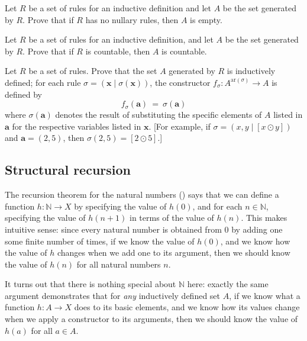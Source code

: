 \begin{exercise}
Let $R$ be a set of rules for an inductive definition and let $A$ be the set generated by $R$. Prove that if $R$ has no nullary rules, then $A$ is empty.
\end{exercise}

\begin{exercise}
Let $R$ be a set of rules for an inductive definition, and let $A$ be the set generated by $R$. Prove that if $R$ is countable, then $A$ is countable.
\end{exercise}

\begin{exercise}
\label{exSetGeneratedByRulesIsInductivelyDefined}
Let $R$ be a set of rules. Prove that the set $A$ generated by $R$ is inductively defined; for each rule $\sigma = (\mathbf{x} \mid \sigma(\mathbf{x}))$, the constructor $f_{\sigma} : A^{\mathrm{ar}(\sigma)} \to A$ is defined by
\[ f_{\sigma}(\mathbf{a}) ~=~ \sigma(\mathbf{a}) \]
where $\sigma(\mathbf{a})$ denotes the result of substituting the specific elements of $A$ listed in $\mathbf{a}$ for the respective variables listed in $\mathbf{x}$. [For example, if $\sigma = (x,y \mid [x \odot y])$ and $\mathbf{a} = (2,5)$, then $\sigma(2,5) = [2 \odot 5]$.]
\end{exercise}

\subsection*{Structural recursion}

The recursion theorem for the natural numbers () says that we can define a function $h : \mathbb{N} \to X$ by specifying the value of $h(0)$, and for each $n \in \mathbb{N}$, specifying the value of $h(n+1)$ in terms of the value of $h(n)$. This makes intuitive sense: since every natural number is obtained from $0$ by adding one some finite number of times, if we know the value of $h(0)$, and we know how the value of $h$ changes when we add one to its argument, then we should know the value of $h(n)$ for all natural numbers $n$.

It turns out that there is nothing special about $\mathbb{N}$ here: exactly the same argument demonstrates that for \textit{any} inductively defined set $A$, if we know what a function $h : A \to X$ does to its basic elements, and we know how its values change when we apply a constructor to its arguments, then we should know the value of $h(a)$ for all $a \in A$.

